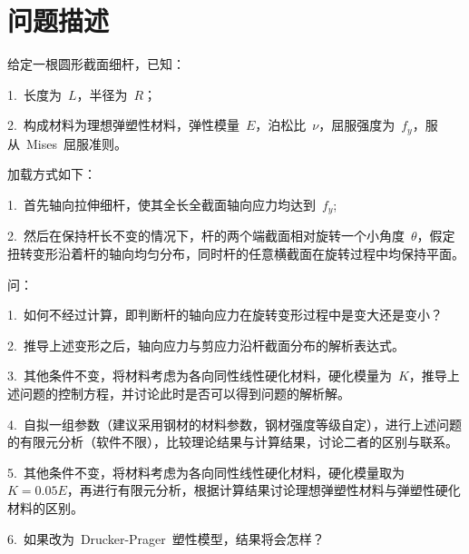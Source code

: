 \chapter{问题描述}
\label{cha:Description}
给定一根圆形截面细杆，已知： 

1.~长度为~{$L$}，半径为~{$R$}； 

2.~构成材料为理想弹塑性材料，弹性模量~{$E$}，泊松比~{$\nu$}，屈服强度为~{$f_y$}，服从~Mises~屈服准则。 

加载方式如下： 

1.~首先轴向拉伸细杆，使其全长全截面轴向应力均达到~{$f_y$}; 

2.~然后在保持杆长不变的情况下，杆的两个端截面相对旋转一个小角度~{$\theta$}，假定扭转变形沿着杆的轴向均匀分布，同时杆的任意横截面在旋转过程中均保持平面。 

问：
 
1.~如何不经过计算，即判断杆的轴向应力在旋转变形过程中是变大还是变小？ 

2.~推导上述变形之后，轴向应力与剪应力沿杆截面分布的解析表达式。

3.~其他条件不变，将材料考虑为各向同性线性硬化材料，硬化模量为~{$K$}，推导上述问题的控制方程，并讨论此时是否可以得到问题的解析解。

4.~自拟一组参数（建议采用钢材的材料参数，钢材强度等级自定），进行上述问题的有限元分析（软件不限），比较理论结果与计算结果，讨论二者的区别与联系。 

5.~其他条件不变，将材料考虑为各向同性线性硬化材料，硬化模量取为~{$K=0.05E$}，再进行有限元分析，根据计算结果讨论理想弹塑性材料与弹塑性硬化材料的区别。 

6.~如果改为~Drucker-Prager~塑性模型，结果将会怎样？ 
